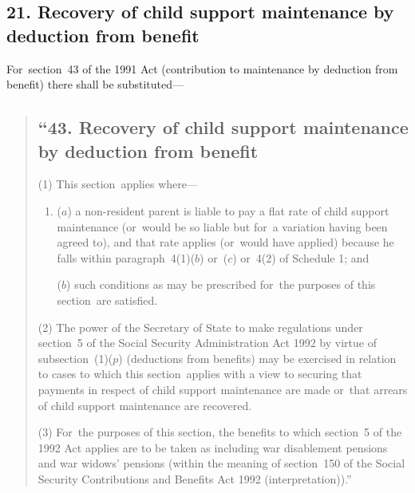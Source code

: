 \documentclass[12pt,a4paper]{article}
\begin{document}

\subsection{21. Recovery of child support maintenance by deduction from benefit}

For~section~43 of the 1991 Act (contribution to maintenance by deduction from benefit) there shall be substituted—
\begin{quotation}
\subsection*{“43. Recovery of child support maintenance by deduction from benefit}

(1) This section~applies where—
\begin{enumerate}\item[]
($a$) a non-resident parent is liable to pay a flat rate of child support maintenance (or~would be so liable but for~a variation having been agreed to), and that rate applies (or~would have applied) because he falls within paragraph~4(1)($b$)  or~($c$)  or~4(2)  of Schedule 1; and

($b$) such conditions as may be prescribed for~the purposes of this section~are satisfied.
\end{enumerate}

(2) The power of the Secretary of State to make regulations under section~5 of the Social Security Administration Act 1992 by virtue of subsection~(1)($p$)  (deductions from benefits) may be exercised in relation to cases to which this section~applies with a view to securing that payments in respect of child support maintenance are made or~that arrears of child support maintenance are recovered.

(3) For~the purposes of this section, the benefits to which section~5 of the 1992 Act applies are to be taken as including war disablement pensions and war widows' pensions (within the meaning of section~150 of the Social Security Contributions and Benefits Act 1992 (interpretation)).”
\end{quotation}

\end{document}
